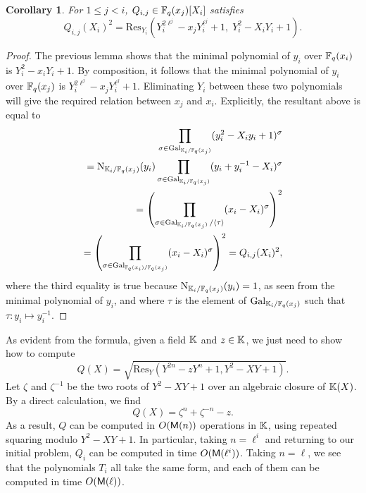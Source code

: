 \documentclass{sig-alternate}
\newtheorem{corollary}[definition]{Corollary}
\begin{document}
\begin{corollary}
  For $1 \le j < i$, $Q_{i,j} \in \mathbb{F}_q(x_{j})[X_i]$ satisfies
  \begin{equation*}
    \label{eq:T2-relpols}
    Q_{i,j}(X_i)^2 = \mathrm{Res}_{Y_i}(Y_i^{2\ell^j}-x_{j}Y_i^{\ell^j}+1,\; Y_i^2-X_i Y_i+1).
  \end{equation*}
\end{corollary}
\begin{proof}
  The previous lemma shows that the minimal polynomial of $y_i$ over
  $\mathbb{F}_q(x_i)$ is $Y_i^2 -x_i Y_i +1$. By composition, it follows that
  the minimal polynomial of $y_i$ over $\mathbb{F}_q(x_{j})$ is
  $Y_i^{2\ell^j}-x_{j} Y_i^{\ell^j}+1$. Eliminating $Y_i$ between
  these two polynomials will give the required relation between
  $x_{j}$ and $x_i$. Explicitly, the resultant above 
  is equal to
\begin{align*}
   \prod_{\sigma\in\operatorname{Gal}_{\mathbb{K}_i/\mathbb{F}_q(x_{j})}}
  (y_i^2 - X_i y_i + 1)^\sigma \\
  =\operatorname{N}_{\mathbb{K}_i/\mathbb{F}_q(x_{j})}(y_i) \prod_{\sigma\in\operatorname{Gal}_{\mathbb{K}_i/\mathbb{F}_q(x_{j})}} 
  (y_i + y_i^{-1} - X_i)^\sigma \\
  =\left(\prod_{\sigma\in\operatorname{Gal}_{\mathbb{K}_i/\mathbb{F}_q(x_{j})}/\langle\tau\rangle}
    (x_i - X_i)^\sigma\right)^2 \\
  =\left(\prod_{\sigma\in\operatorname{Gal}_{\mathbb{F}_q(x_i)/\mathbb{F}_q(x_{j})}}
    (x_i - X_i)^\sigma\right)^2 =Q_{i,j}(X_i)^2,
\end{align*}
where the third equality is true because
$\operatorname{N}_{\mathbb{K}_i/\mathbb{F}_q(x_{j})}(y_i)=1$, as seen from the minimal polynomial of
$y_i$, and where $\tau$ is the element of
$\operatorname{Gal}_{\mathbb{K}_i/\mathbb{F}_q(x_{j})}$ such that $\tau:y_i\mapsto y_i^{-1}$.
\end{proof}

As evident from the formula, given a field $\mathbb{K}$ and $z \in \mathbb{K}$, we
just need to show how to compute
\begin{equation*}
  Q(X) = \sqrt{\mathrm{Res}_Y(Y^{2 n}-z Y^n+1, Y^2-XY+1)}.
\end{equation*}
Let $\zeta$ and $\zeta^{-1}$ be the two roots of $Y^2-XY+1$ over an
algebraic closure of $\mathbb{K}(X)$. By a direct calculation, we find
\begin{equation*}
  Q(X) = \zeta^n + \zeta^{-n} - z.
\end{equation*}
As a result, $Q$ can be computed in $O(\mathsf{M}(n))$ operations in $\mathbb{K}$,
using repeated squaring modulo $Y^2-XY+1$. In particular, taking
$n=\ell^i$ and returning to our initial problem, $Q_i$ can be computed
in time $O(\mathsf{M}(\ell^i))$. Taking $n=\ell$, we see that the
polynomials $T_i$ all take the same form, and each of them can be
computed in time $O(\mathsf{M}(\ell))$.
\end{document}
